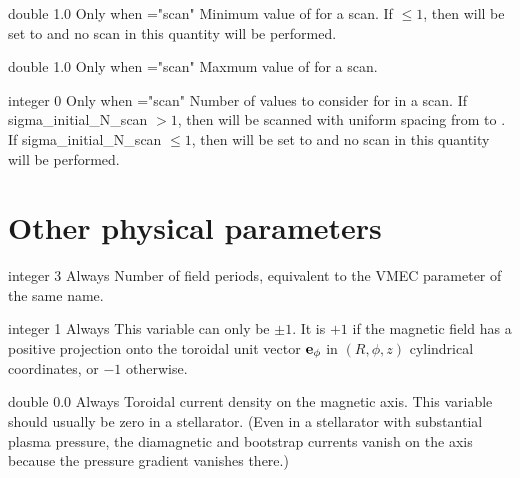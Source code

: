 \myhrule

{double}
{1.0}
{Only when ={\ttfamily "scan"}}
{Minimum value of  for a scan. If $\le 1$, then  will be set to  and no scan in this quantity will be performed.
}

\myhrule

{double}
{1.0}
{Only when ={\ttfamily "scan"}}
{Maxmum value of  for a scan.
}

\myhrule

{integer}
{0}
{Only when ={\ttfamily "scan"}}
{Number of values to consider for  in a scan. If {\ttfamily sigma\_initial\_N\_scan} $>1$, then  will be scanned with uniform spacing from  to .
If {\ttfamily sigma\_initial\_N\_scan} $\le 1$, then  will be set to  and no scan in
this quantity will be performed.
}

\myhrule



\section{Other physical parameters}

{integer}
{3}
{Always}
{Number of field periods, equivalent to the VMEC parameter of the same name.}

\myhrule

{integer}
{1}
{Always}
{This variable can only be $\pm 1$. It is $+1$ if the magnetic field has a positive projection onto the toroidal unit vector ${\mathbf e}_\phi$
in $(R,\phi,z)$ cylindrical coordinates, or $-1$ otherwise.}

\myhrule

{double}
{0.0}
{Always}
{Toroidal current density on the magnetic axis. This variable should usually be zero in a stellarator.  (Even in a stellarator with substantial plasma pressure, the diamagnetic and bootstrap currents vanish on the axis because the pressure gradient vanishes there.)}

